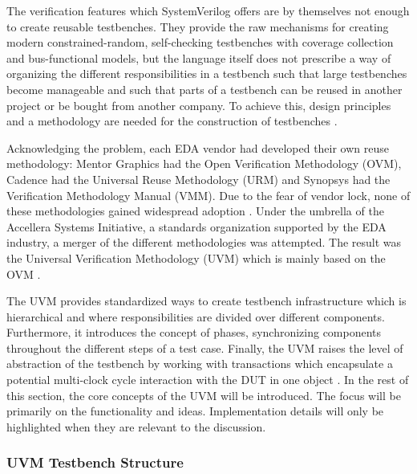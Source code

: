 The verification features which SystemVerilog offers are by themselves not enough to create reusable testbenches. They provide
the raw mechanisms for creating modern constrained-random, self-checking testbenches with coverage collection and
bus-functional models, but the language itself does not prescribe a way of organizing the different responsibilities
in a testbench such that large testbenches become manageable and such that parts of a testbench can be reused in
another project or be bought from another company. To achieve this, design principles and a methodology are needed for
the construction of testbenches \cite[Sec. 9.2]{flake2020a}.

Acknowledging the problem, each EDA vendor had developed their own reuse methodology: Mentor Graphics had the Open
Verification Methodology (OVM), Cadence had the Universal Reuse Methodology (URM) and Synopsys had the Verification
Methodology Manual (VMM). Due to the fear of vendor lock, none of these methodologies gained widespread adoption
\cite[ch. 4.1]{mehta2018asic}. Under the umbrella of the Accellera Systems Initiative, a standards organization
supported by the EDA industry, a merger of the different methodologies was attempted. The result was the Universal
Verification Methodology (UVM) which is mainly based on the OVM \cite[ch. 4.1]{mehta2018asic}.

The UVM provides standardized ways to create testbench infrastructure which is hierarchical and where
responsibilities are divided over different components. Furthermore, it introduces the concept of phases,
synchronizing components throughout the different steps of a test case. Finally, the UVM raises the level of
abstraction of the testbench by working with transactions which encapsulate a potential multi-clock cycle interaction
with the DUT in one object \cite[ch. 4.1]{mehta2018asic}. In the rest of this section, the core concepts of the UVM
will be introduced. The focus will be primarily on the functionality and ideas. Implementation details will only be
highlighted when they are relevant to the discussion.

\subsubsection{UVM Testbench Structure} %

